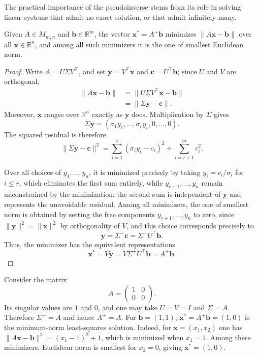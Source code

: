 The practical importance of the pseudoinverse stems from its role in solving linear systems that admit no exact solution, or that admit infinitely many.

\begin{theorem}
Given $A \in M_{m,n}$ and $\mathbf{b} \in \mathbb{R}^m$, the vector $\mathbf{x}^{*} = A^{+}\mathbf{b}$ minimizes $\|A\mathbf{x} - \mathbf{b}\|$ over all $\mathbf{x} \in \mathbb{R}^n$, and among all such minimizers it is the one of smallest Euclidean norm.
\end{theorem}

\begin{proof}
Write $A = U\Sigma V^{\top}$, and set $\mathbf{y} = V^{\top}\mathbf{x}$ and $\mathbf{c} = U^{\top}\mathbf{b}$; since $U$ and $V$ are orthogonal,
\[
\begin{aligned}
\|A\mathbf{x}-\mathbf{b}\| &= \|U\Sigma V^{\top}\mathbf{x} - \mathbf{b}\| \\
&= \|\Sigma \mathbf{y} - \mathbf{c}\|.
\end{aligned}
\]
Moreover, $\mathbf{x}$ ranges over $\mathbb{R}^n$ exactly as $\mathbf{y}$ does. Multiplication by $\Sigma$ gives
\[
\Sigma \mathbf{y} = (\sigma_1 y_1, \dots, \sigma_r y_r, 0, \dots, 0).
\]
The squared residual is therefore
\[
\|\Sigma\mathbf{y} - \mathbf{c}\|^2 = \sum_{i=1}^r (\sigma_i y_i - c_i)^2 + \sum_{i=r+1}^{m} c_i^2.
\]

Over all choices of $y_1, \dots, y_n$, it is minimized precisely by taking $y_i = c_i/\sigma_i$ for $i \leq r$, which eliminates the first sum entirely, while $y_{r+1}, \dots, y_n$ remain unconstrained by the minimization; the second sum is independent of $\mathbf{y}$ and represents the unavoidable residual. Among all minimizers, the one of smallest norm is obtained by setting the free components $y_{r+1}, \dots, y_n$ to zero, since $\|\mathbf{y}\|^2 = \|\mathbf{x}\|^2$ by orthogonality of $V$, and this choice corresponds precisely to
\[
\mathbf{y} = \Sigma^{+}\mathbf{c} = \Sigma^{+}U^{\top}\mathbf{b}.
\]
Thus, the minimizer has the equivalent representations
\[
\mathbf{x}^{*} = V\mathbf{y}
= V\Sigma^{+}U^{\top}\mathbf{b}
= A^{+}\mathbf{b}.
\]

\end{proof}



\begin{example}
Consider the matrix
\[
A = \begin{pmatrix} 1 & 0 \\ 0 & 0 \end{pmatrix}.
\]
Its singular values are $1$ and $0$, and one may take
$U=V=I$ and $\Sigma=A$. Therefore $\Sigma^+=A$ and hence $A^+=A$.
For $\mathbf{b}=(1,1)$, $\mathbf{x}^{*} = A^{+}\mathbf{b} = (1,0)$ is the minimum-norm least-squares solution. Indeed, for
$\mathbf{x}=(x_1,x_2)$ one has
$\|A\mathbf{x}-\mathbf{b}\|^2=(x_1-1)^2+1$, which is minimized when
$x_1=1$. Among these minimizers, Euclidean norm is smallest for $x_2=0$,
giving $\mathbf{x}^*=(1,0)$.
\end{example}
